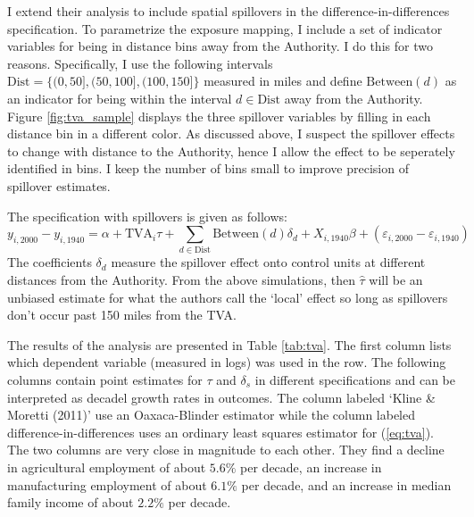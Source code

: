 \documentclass[11pt]{article}
\begin{document}
I extend their analysis to include spatial spillovers in the difference-in-differences specification. To parametrize the exposure mapping, I include a set of indicator variables for being in distance bins away from the Authority. I do this for two reasons. Specifically, I use the following intervals $\text{Dist} = \{(0, 50], (50, 100], (100, 150]\}$ measured in miles and define $\text{Between}(d)$ as an indicator for being within the interval $d \in \text{Dist}$ away from the Authority. Figure \ref{fig:tva_sample} displays the three spillover variables by filling in each distance bin in a different color. As discussed above, I suspect the spillover effects to change with distance to the Authority, hence I allow the effect to be seperately identified in bins. I keep the number of bins small to improve precision of spillover estimates. 

The specification with spillovers is given as follows:  
\begin{equation}\label{eq:tva_spillover}
    y_{i, 2000} - y_{i, 1940} = \alpha + \text{TVA}_i \tau + \sum_{d \in \text{Dist}} \text{Between}(d)\delta_d + X_{i, 1940} \beta + (\varepsilon_{i, 2000} - \varepsilon_{i, 1940})
\end{equation} 
The coefficients $\delta_d$ measure the spillover effect onto control units at different distances from the Authority. From the above simulations, then $\hat{\tau}$ will be an unbiased estimate for what the authors call the `local' effect so long as spillovers don't occur past 150 miles from the TVA.

The results of the analysis are presented in Table \ref{tab:tva}. The first column lists which dependent variable (measured in logs) was used in the row. The following columns contain point estimates for $\tau$ and $\delta_s$ in different specifications and can be interpreted as decadel growth rates in outcomes. The column labeled `Kline \& Moretti (2011)' use an Oaxaca-Blinder estimator while the column labeled difference-in-differences uses an ordinary least squares estimator for (\ref{eq:tva}). The two columns are very close in magnitude to each other. They find a decline in agricultural employment of about $5.6\%$ per decade, an increase in manufacturing employment of about $6.1\%$ per decade, and an increase in median family income of about $2.2\%$ per decade. 
\end{document}
